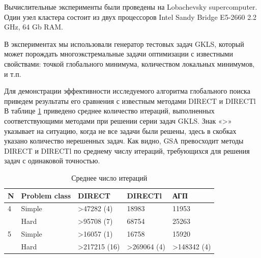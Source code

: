 \documentclass{svproc}
\begin{document}
Вычислительные эксперименты были проведены на Lobachevsky supercomputer. Один узел кластера состоит из двух процессоров Intel Sandy Bridge E5-2660 2.2 GHz, 64 Gb RAM. 

В экспериментах мы использовали генератор тестовых задач GKLS, который может порождать многоэкстремальные задачи оптимизации с известными свойствами: точкой глобального минимума, количеством локальных минимумов, и т.п.

Для демонстрации эффективности исследуемого алгоритма глобального поиска приведем результаты его сравнения с известным методами DIRECT и DIRECTl
В таблице \ref{tab:1} приведено среднее количество итераций, выполненных соответствующими методами при решении серии задач GKLS. Знак «>» указывает на ситуацию, когда не все задачи были решены, здесь в скобках указано количество нерешенных задач. Как видно, GSA превосходит методы DIRECT и DIRECTl по среднему числу итераций, требующихся для решения задач с одинаковой точностью.

\begin{table}[!ht]
    \caption{Среднее число итераций}
    \label{tab:1}
    \centering
    \begin{tabular}{|l|l|l|l|l|}
    \hline
        N & Problem class & DIRECT & DIRECTl & АГП  \\ \hline
        4 & Simple & >47282 (4) & 18983 & 11953  \\ \hline
        ~ & Hard & >95708 (7) & 68754 & 25263  \\ \hline
        5 & Simple & >16057 (1) & 16758 & 15920  \\ \hline
        ~ & Hard & >217215 (16) & >269064 (4) & >148342 (4)  \\ \hline
    \end{tabular}
\end{table}


\end{document}
